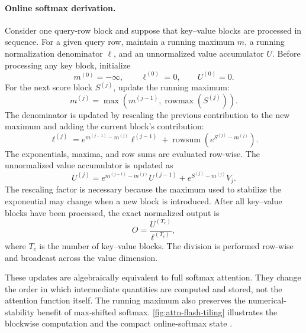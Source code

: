 \paragraph{Online softmax derivation.}
Consider one query-row block and suppose that key--value blocks are
processed in sequence. For a given query row, maintain a running maximum
\(m\), a running normalization denominator \(\ell\), and an
unnormalized value accumulator \(U\). Before processing any key block,
initialize
\begin{equation}
    m^{(0)}=-\infty,
    \qquad
    \ell^{(0)}=0,
    \qquad
    U^{(0)}=0.
    \label{eq:attn-online-softmax-initialization}
\end{equation}
For the next score block \(S^{(j)}\), update the running maximum:
\begin{equation}
    m^{(j)}
    =
    \max\left(
        m^{(j-1)},
        \operatorname{rowmax}(S^{(j)})
    \right).
    \label{eq:attn-online-softmax-max}
\end{equation}
The denominator is updated by rescaling the previous contribution to the
new maximum and adding the current block's contribution:
\begin{equation}
    \boxed{
    \ell^{(j)}
    =
    e^{m^{(j-1)}-m^{(j)}}\ell^{(j-1)}
    +
    \operatorname{rowsum}
    \left(
        e^{S^{(j)}-m^{(j)}}
    \right)
    }.
    \label{eq:attn-online-softmax-denominator}
\end{equation}
The exponentials, maxima, and row sums are evaluated row-wise. The
unnormalized value accumulator is updated as
\begin{equation}
    \boxed{
    U^{(j)}
    =
    e^{m^{(j-1)}-m^{(j)}}U^{(j-1)}
    +
    e^{S^{(j)}-m^{(j)}}V_j
    }.
    \label{eq:attn-online-softmax-output}
\end{equation}
The rescaling factor is necessary because the maximum used to stabilize
the exponential may change when a new block is introduced. After all
key--value blocks have been processed, the exact normalized output is
\begin{equation}
    O=\frac{U^{(T_c)}}{\ell^{(T_c)}},
    \label{eq:attn-online-softmax-final}
\end{equation}
where \(T_c\) is the number of key--value blocks. The division is
performed row-wise and broadcast across the value dimension.

These updates are algebraically equivalent to full softmax attention.
They change the order in which intermediate quantities are computed and
stored, not the attention function itself. The running maximum also
preserves the numerical-stability benefit of max-shifted softmax.
\cref{fig:attn-flash-tiling} illustrates the blockwise computation and
the compact online-softmax state
\parencite{dao2023flashattention2}.

